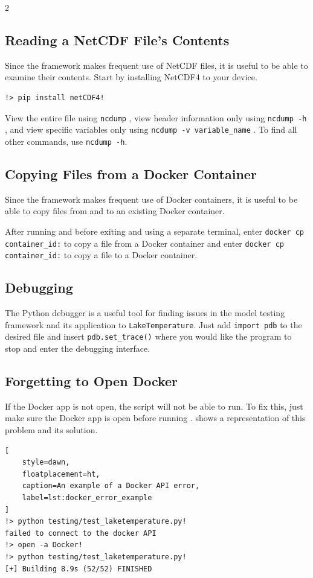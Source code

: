 \documentclass[10pt]{article}
\begin{document}
\begin{multicols}{2}
\subsection{Reading a NetCDF File's Contents}
Since the framework makes frequent use of NetCDF files, it is useful to be able to examine their contents. Start by installing NetCDF4 to your device. 
\begin{lstlisting}[style=dawn]
!> pip install netCDF4!
\end{lstlisting}

View the entire file using \verb|ncdump| , view header information only using \verb|ncdump -h| , and view specific variables only using \verb|ncdump -v variable_name| . To find all other commands, use \verb|ncdump -h|. 

\subsection{Copying Files from a Docker Container}
Since the framework makes frequent use of Docker containers, it is useful to be able to copy files from and to an existing Docker container. 

After running and before exiting  and using a separate terminal, enter \verb|docker cp container_id:|  to copy a file from a Docker container and enter \verb|docker cp|  \verb|container_id:| to copy a file to a Docker container. 

\subsection{Debugging}
The Python debugger is a useful tool for finding issues in the model testing framework and its application to \verb|LakeTemperature|. Just add \verb|import pdb| to the desired file and insert \verb|pdb.set_trace()| where you would like the program to stop and enter the debugging interface. 

\subsection{Forgetting to Open Docker}
If the Docker app is not open, the  script will not be able to run. To fix this, just make sure the Docker app is open before running .  shows a representation of this problem and its solution. 

\begin{lstlisting}[
    style=dawn,
    floatplacement=ht,
    caption=An example of a Docker API error,
    label=lst:docker_error_example
]
!> python testing/test_laketemperature.py!
failed to connect to the docker API
!> open -a Docker!
!> python testing/test_laketemperature.py!
[+] Building 8.9s (52/52) FINISHED
\end{lstlisting}




\end{multicols}
\end{document}
